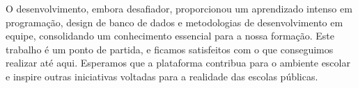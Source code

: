 \documentclass[main.tex]{subfiles}
\begin{document}
O desenvolvimento, embora desafiador, proporcionou um aprendizado intenso em programação, design de banco de dados e metodologias de desenvolvimento em equipe, consolidando um conhecimento essencial para a nossa formação. Este trabalho é um ponto de partida, e ficamos satisfeitos com o que conseguimos realizar até aqui. Esperamos que a plataforma contribua para o ambiente escolar e inspire outras iniciativas voltadas para a realidade das escolas públicas.



\end{document}
